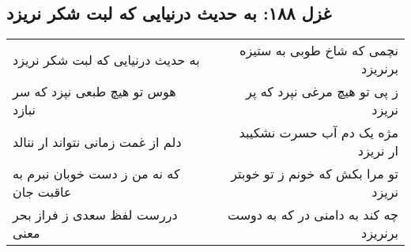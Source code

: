 \begin{center}
\section*{غزل ۱۸۸: به حدیث درنیایی که لبت شکر نریزد}
\label{sec:188}
\begin{longtable}{l p{0.5cm} r}
به حدیث درنیایی که لبت شکر نریزد
&&
نچمی که شاخ طوبی به ستیزه برنریزد
\\
هوس تو هیچ طبعی نپزد که سر نبازد
&&
ز پی تو هیچ مرغی نپرد که پر نریزد
\\
دلم از غمت زمانی نتواند ار ننالد
&&
مژه یک دم آب حسرت نشکیبد ار نریزد
\\
که نه من ز دست خوبان نبرم به عاقبت جان
&&
تو مرا بکش که خونم ز تو خوبتر نریزد
\\
دررست لفظ سعدی ز فراز بحر معنی
&&
چه کند به دامنی در که به دوست برنریزد
\\
\end{longtable}
\end{center}
